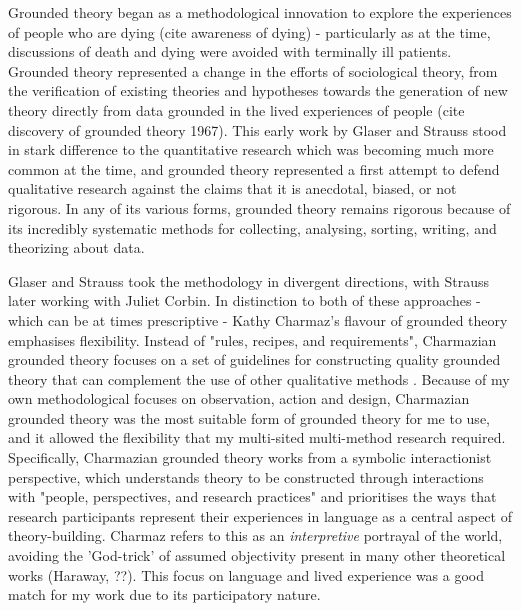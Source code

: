 Grounded theory began as a methodological innovation to explore the experiences of people who are dying (cite awareness of dying) - particularly as at the time, discussions of death and dying were avoided with terminally ill patients. Grounded theory represented a change in the efforts of sociological theory, from the verification of existing theories and hypotheses towards the generation of new theory directly from data grounded in the lived experiences of people (cite discovery of grounded theory 1967). This early work by Glaser and Strauss stood in stark difference to the quantitative research which was becoming much more common at the time, and grounded theory represented a first attempt to defend qualitative research against the claims that it is anecdotal, biased, or not rigorous. In any of its various forms, grounded theory remains rigorous because of its incredibly systematic methods for collecting, analysing, sorting, writing, and theorizing about data. 

Glaser and Strauss took the methodology in divergent directions, with Strauss later working with Juliet Corbin. In distinction to both of these approaches - which can be at times prescriptive - Kathy Charmaz's flavour of grounded theory emphasises flexibility. Instead of "rules, recipes, and requirements", Charmazian grounded theory focuses on a set of guidelines for constructing quality grounded theory that can complement the use of other qualitative methods  \cite{charmaz_constructing_2006, 10}. Because of my own methodological focuses on observation, action and design, Charmazian grounded theory was the most suitable form of grounded theory for me to use, and it allowed the flexibility that my multi-sited multi-method research required. Specifically, Charmazian grounded theory works from a symbolic interactionist perspective, which understands theory to be constructed through interactions with "people, perspectives, and research practices" and prioritises the ways that research participants represent their experiences in language as a central aspect of theory-building. Charmaz refers to this as an \textit{interpretive} portrayal of the world, avoiding the 'God-trick' of assumed objectivity present in many other theoretical works (Haraway, ??). This focus on language and lived experience was a good match for my work due to its participatory nature. 

